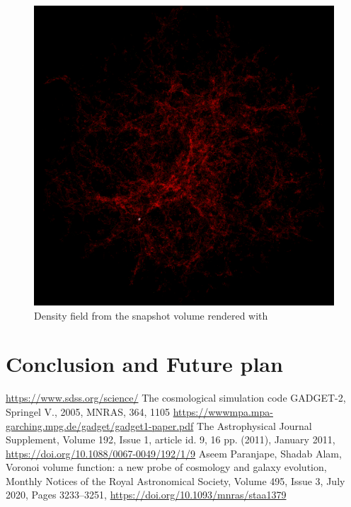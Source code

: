 \documentclass[12pt]{article}
\begin{document}
\begin{figure}[H]
	\centering
	\includegraphics[width=0.5\linewidth]{../density_assign/UniformGridData_Render_density}
	\caption{Density field from the snapshot volume rendered with \cite{yt-project}}
	\label{fig:uniformgriddatarenderdensity}
\end{figure}


\section{Conclusion and Future plan}




\begin{thebibliography}{widest entry}
 \url{https://www.sdss.org/science/}
 The cosmological simulation code GADGET-2,  Springel V., 2005, MNRAS, 364, 1105 \url{https://wwwmpa.mpa-garching.mpg.de/gadget/gadget1-paper.pdf}
The Astrophysical Journal Supplement, Volume 192, Issue 1, article id. 9, 16 pp. (2011), January 2011, \url{https://doi.org/10.1088/0067-0049/192/1/9}
 Aseem Paranjape, Shadab Alam, Voronoi volume function: a new probe of cosmology and galaxy evolution, Monthly Notices of the Royal Astronomical Society, Volume 495, Issue 3, July 2020, Pages 3233–3251, \url{https://doi.org/10.1093/mnras/staa1379}
\end{thebibliography}
\end{document}
